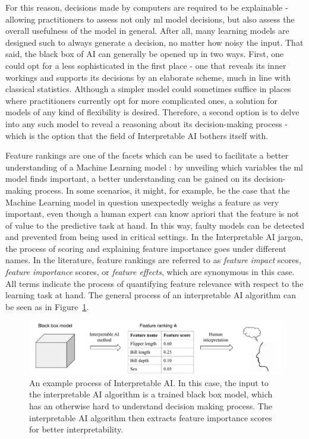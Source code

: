 \documentclass[../main.tex]{subfiles}
\begin{document}
For this reason, decisions made by computers are required to be explainable - allowing practitioners to assess not only \gls{ml} model decisions, but also assess the overall usefulness of the model in general. After all, many learning models are designed such to always generate a decision, no matter how noisy the input. That said, the black box of AI can generally be opened up in two ways. First, one could opt for a less sophisticated in the first place - one that reveals its inner workings and supports its decisions by an elaborate scheme, much in line with classical statistics. Although a simpler model could sometimes suffice in places where practitioners currently opt for more complicated ones, a solution for models of any kind of flexibility is desired. Therefore, a second option is to delve into any such model to reveal a reasoning about its decision-making process - which is the option that the field of Interpretable AI bothers itself with.

Feature rankings are one of the facets which can be used to facilitate a better understanding of a Machine Learning model \citep{hansen_interpretability_2019}: by unveiling which variables the \gls{ml} model finds important, a better understanding can be gained on its decision-making process. In some scenarios, it might, for example, be the case that the Machine Learning model in question unexpectedly weighs a feature as very important, even though a human expert can know apriori that the feature is not of value to the predictive task at hand. In this way, faulty models can be detected and prevented from being used in critical settings. In the Interpretable AI jargon, the process of scoring and explaining feature importance goes under different names. In the literature, feature rankings are referred to as \textit{feature impact} scores, \textit{feature importance} scores, or \textit{feature effects}, which are synonymous in this case. All terms indicate the process of quantifying feature relevance with respect to the learning task at hand. The general process of an interpretable AI algorithm can be seen as in Figure~\ref{fig:schematic-interpretable-ai}.

\begin{figure}[ht]
    \centering
    \includegraphics[width=\linewidth]{report/images/schematic-interpretable-ai.pdf}
    \caption{An example process of Interpretable AI. In this case, the input to the interpretable AI algorithm is a trained black box model, which has an otherwise hard to understand decision making process. The interpretable AI algorithm then extracts feature importance scores for better interpretability.}
    \label{fig:schematic-interpretable-ai}
\end{figure}
\end{document}
